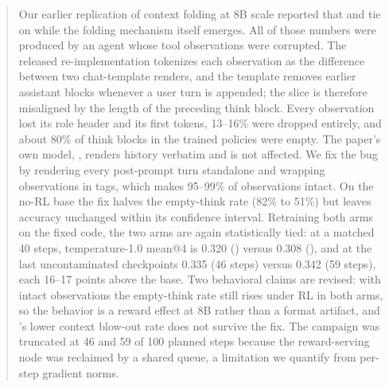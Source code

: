 \begin{abstract}
Our earlier replication of context folding \citep{sun2025contextfolding} at 8B scale reported
that \foldgrpo{} and \grpo{} tie on \bcplus{} while the folding mechanism itself emerges. All of
those numbers were produced by an agent whose tool observations were corrupted. The released
re-implementation tokenizes each observation as the difference between two chat-template
renders, and the \qwen{} template removes earlier assistant \think{} blocks whenever a user
turn is appended; the slice is therefore misaligned by the length of the preceding think
block. Every observation lost its role header and its first tokens, 13--16\% were dropped
entirely, and about 80\% of think blocks in the trained policies were empty. The paper's own
model, \seedoss{}, renders history verbatim and is not affected. We fix the bug by rendering
every post-prompt turn standalone and wrapping observations in \toolresp{} tags, which makes
95--99\% of observations intact. On the no-RL base the fix halves the empty-think rate (82\% to
51\%) but leaves accuracy unchanged within its confidence interval. Retraining both arms on
the fixed code, the two arms are again statistically tied: at a matched 40 steps, temperature-1.0
mean@4 is 0.320 (\foldgrpo{}) versus 0.308 (\grpo{}), and at the last uncontaminated
checkpoints 0.335 (46 steps) versus 0.342 (59 steps), each 16--17 points above the base. Two
behavioral claims are revised: with intact observations the empty-think rate still rises under
RL in both arms, so the behavior is a reward effect at 8B rather than a format artifact, and
\foldgrpo{}'s lower context blow-out rate does not survive the fix. The campaign was truncated
at 46 and 59 of 100 planned steps because the reward-serving node was reclaimed by a shared
queue, a limitation we quantify from per-step gradient norms.
\end{abstract}
